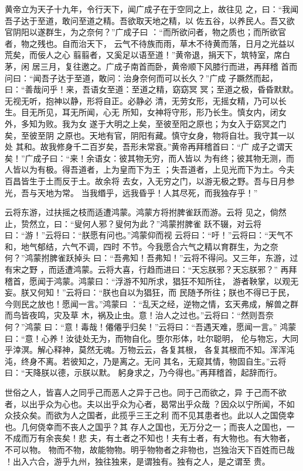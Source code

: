 \documentclass[12pt,UTF8]{ctexbook}
\begin{document}
黄帝立为天子十九年，令行天下，闻广成子在于空同之上，故往见 之，曰：“我闻吾子达于至道，敢问至道之精。吾欲取天地之精，以 佐五谷，以养民人。吾又欲官阴阳以遂群生，为之奈何？”广成子曰 ：“而所欲问者，物之质也；而所欲官者，物之残也。自而治天下， 云气不待族而雨，草木不待黄而落，日月之光益以荒矣，而佞人之心 翦翦者，又奚足以语至道！”黄帝退，捐天下，筑特室，席白茅，闲 居三月，复往邀之。广成子南首而卧，黄帝顺下风膝行而进，再拜稽 首而问曰：“闻吾子达于至道，敢问：治身奈何而可以长久？”广成 子蹶然而起，曰：“善哉问乎！来，吾语女至道：至道之精，窈窈冥 冥；至道之极，昏昏默默。无视无听，抱神以静，形将自正。必静必 清，无劳女形，无摇女精，乃可以长生。目无所见，耳无所闻，心无 所知，女神将守形，形乃长生。慎女内，闭女外，多知为败。我为女 遂于大明之上矣，至彼至阳之原也；为女入于窈冥之门矣，至彼至阴 之原也。天地有官，阴阳有藏。慎守女身，物将自壮。我守其一以处 其和。故我修身千二百岁矣，吾形未常衰。”黄帝再拜稽首曰：“广 成子之谓天矣！”广成子曰：“来！余语女：彼其物无穷，而人皆以 为有终；彼其物无测，而人皆以为有极。得吾道者，上为皇而下为王 ；失吾道者，上见光而下为土。今夫百昌皆生于土而反于土。故余将 去女，入无穷之门，以游无极之野。吾与日月参光，吾与天地为常。 当我缗乎，远我昏乎！人其尽死，而我独存乎！”

云将东游，过扶摇之枝而适遭鸿蒙。鸿蒙方将拊脾雀跃而游。云将 见之，倘然止，贽然立，曰：“叟何人邪？叟何为此？”鸿蒙拊脾雀 跃不辍，对云将曰：“游！”云将曰：“朕愿有问也。”鸿蒙仰而视 云将曰：“吁！”云将曰：“天气不和，地气郁结，六气不调，四时 不节。今我愿合六气之精以育群生，为之奈何？”鸿蒙拊脾雀跃掉头 曰：“吾弗知！吾弗知！”云将不得问。又三年，东游，过有宋之野 ，而适遭鸿蒙。云将大喜，行趋而进曰：“天忘朕邪？天忘朕邪？” 再拜稽首，愿闻于鸿蒙。鸿蒙曰：“浮游不知所求，猖狂不知所往， 游者鞅掌，以观无妄。朕又何知！”云将曰：“朕也自以为猖狂，而 民随予所往；朕也不得已于民，今则民之放也！愿闻一言。”鸿蒙曰 ：“乱天之经，逆物之情，玄天弗成，解兽之群而鸟皆夜鸣，灾及草 木，祸及止虫。意！治人之过也。”云将曰：“然则吾奈何？”鸿蒙 曰：“意！毒哉！僊僊乎归矣！”云将曰：“吾遇天难，愿闻一言。” 鸿蒙曰：“意！心养！汝徒处无为，而物自化。堕尔形体，吐尔聪明， 伦与物忘，大同乎涬溟。解心释神，莫然无魂。万物云云，各复其根， 各复其根而不知。浑浑沌沌，终身不离。若彼知之，乃是离之。无问 其名，无窥其情，物固自生。”云将曰：“天降朕以德，示朕以默。 躬身求之，乃今得也。”再拜稽首，起辞而行。

世俗之人，皆喜人之同乎己而恶人之异于己也。同于己而欲之，异 于己而不欲者，以出乎众为心也。夫以出乎众为心者，曷常出乎众哉 ？因众以宁所闻，不如众技众矣。而欲为人之国者，此揽乎三王之利 而不见其患者也。此以人之国侥幸也。几何侥幸而不丧人之国乎？其 存人之国也，无万分之一；而丧人之国也，一不成而万有余丧矣！悲 夫，有土者之不知也！夫有土者，有大物也。有大物者，不可以物。 物而不物，故能物物。明乎物物者之非物也，岂独治天下百姓而已哉 ！出入六合，游乎九州，独往独来，是谓独有。独有之人，是之谓至 贵。
\end{document}
